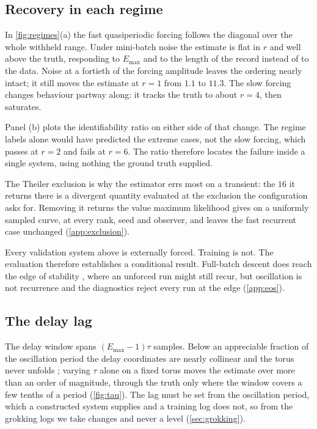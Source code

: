 \documentclass[twoside]{article}
\begin{document}
\subsection{Recovery in each regime}\label{sec:regime}

In \cref{fig:regimes}(a) the fast quasiperiodic forcing follows the diagonal over the whole withheld range. Under
mini-batch noise the estimate is flat in $r$ and well above the truth, responding to $E_{\max}$ and
to the length of the record instead of to the data. Noise at a fortieth of the forcing amplitude
leaves the ordering nearly intact; it still moves the estimate at $r = 1$ from $1.1$ to $11.3$.
The slow forcing changes behaviour partway along: it tracks the truth to about $r = 4$, then
saturates.

Panel (b) plots the identifiability ratio on either side of that change. The regime labels alone
would have predicted the extreme cases, not the slow
forcing, which passes at $r = 2$ and fails at
$r = 6$. The ratio therefore locates the failure inside a single system, using nothing the ground
truth supplied.

The Theiler exclusion is why the estimator errs most on a transient: the $16$ it returns there is a
divergent quantity evaluated at the exclusion the configuration asks for. Removing it returns the
value maximum likelihood gives on a uniformly sampled curve, at every rank, seed and observer, and
leaves the fast recurrent case unchanged (\cref{app:exclusion}).

Every validation system above is externally forced. Training is not. The evaluation therefore establishes a conditional result.
Full-batch descent does reach the edge of stability \citep{cohen2021gradient}, where an unforced
run might still recur, but oscillation is not recurrence and the diagnostics reject every run at
the edge (\cref{app:eos}).

\subsection{The delay lag}\label{sec:tau}

The delay window spans $(E_{\max}-1)\tau$ samples. Below an appreciable fraction of the oscillation
period the delay coordinates are nearly collinear and the torus never unfolds
\citep{casdagli1991state}; varying $\tau$ alone on a fixed torus moves the estimate over more than
an order of magnitude, through the truth only where the window covers a few tenths of a period
(\cref{fig:tau}). The lag must be set from the oscillation period, which a constructed system
supplies and a training log does not, so from the grokking logs we take changes and never a
level (\cref{sec:grokking}).
\end{document}
